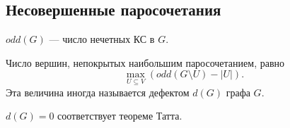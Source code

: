 \subsection{Несовершенные паросочетания}

\begin{notice}
    $odd(G)$ --- число нечетных КС в $G$.
\end{notice}

\begin{theorem}
    Число вершин, непокрытых наибольшим паросочетанием, равно
    \[
    \max\limits_{U \subseteq V} (odd(G \setminus U) - |U|).   
    \]
    Эта величина иногда называется дефектом $d(G)$ графа $G$.
\end{theorem}

\begin{notice}
    $d(G) = 0$ соответствует теореме Татта.
\end{notice}

